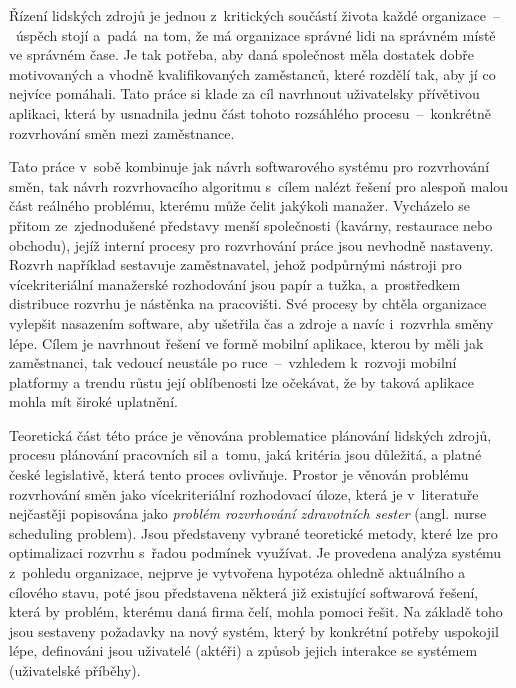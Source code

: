 \documentclass[a4paper,11pt,openany,twoside]{book}
\begin{document}
Řízení lidských zdrojů je jednou z~kritických součástí života každé organizace~–~úspěch stojí a~padá~na tom, že má organizace správné lidi na správném místě ve správném čase. Je tak potřeba, aby daná společnost měla dostatek dobře motivovaných a vhodně kvalifikovaných zaměstanců, které rozdělí tak, aby jí co nejvíce pomáhali. Tato práce si klade za cíl navrhnout uživatelsky přívětivou aplikaci, která by usnadnila jednu část tohoto rozsáhlého procesu~–~konkrétně rozvrhování směn mezi zaměstnance.

Tato práce v~sobě kombinuje jak návrh softwarového systému pro rozvrhování směn, tak návrh rozvrhovacího algoritmu s~cílem nalézt řešení pro alespoň malou část reálného problému, kterému může čelit jakýkoli manažer. Vycházelo se přitom ze~zjednodušené představy menší společnosti (kavárny, restaurace nebo obchodu), jejíž interní procesy pro rozvrhování práce jsou nevhodně nastaveny. Rozvrh například sestavuje zaměstnavatel, jehož podpůrnými nástroji pro vícekriteriální manažerské rozhodování jsou papír a tužka, a~prostředkem distribuce rozvrhu je nástěnka na pracovišti. Své procesy by chtěla organizace vylepšit nasazením software, aby ušetřila čas a zdroje a navíc i~rozvrhla směny lépe. Cílem je navrhnout řešení ve formě mobilní aplikace, kterou by měli jak zaměstnanci, tak vedoucí neustále po ruce~–~vzhledem k~rozvoji mobilní platformy a trendu růstu její oblíbenosti lze očekávat, že by taková aplikace mohla mít široké uplatnění.


Teoretická část této práce je věnována problematice plánování lidských zdrojů, procesu plánování pracovních sil a~tomu, jaká kritéria jsou důležitá, a platné české legislativě, která tento proces ovlivňuje. Prostor je věnován problému rozvrhování směn jako vícekriteriální rozhodovací úloze, která je v~literatuře nejčastěji popisována jako \textit{problém rozvrhování zdravotních sester} (angl. nurse scheduling problem). Jsou představeny vybrané teoretické metody, které lze pro optimalizaci rozvrhu s~řadou podmínek využívat. Je provedena analýza systému z~pohledu organizace, nejprve je vytvořena hypotéza ohledně aktuálního a cílového stavu, poté jsou představena některá již existující softwarová řešení, která by problém, kterému daná firma čelí, mohla pomoci řešit. Na základě toho jsou sestaveny požadavky na nový systém, který by konkrétní potřeby uspokojil lépe, definováni jsou uživatelé (aktéři) a způsob jejich interakce se systémem (uživatelské příběhy).
\end{document}
